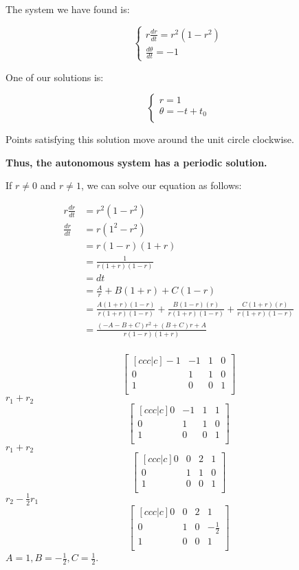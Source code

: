 \documentclass[letterpaper,12pt]{article}
\begin{document}
The system we have found is:

\[\begin{cases}
    r \frac{dr}{dt} = r^2(1-r^2)\\
    \frac{d\theta}{dt} = -1
    \end{cases}
\]


One of our solutions is:


\[\begin{cases}
    r = 1\\
    \theta = -t + t_0\\
    \end{cases}
\]


Points satisfying this solution move around the unit circle clockwise.


\textbf{Thus, the autonomous system has a periodic solution.}


If $r \ne 0$ and $r \ne 1$, we can solve our equation as follows:

\begin{align*}
    r \frac{dr}{dt} &= r^2 (1-r^2)\\
    \frac{dr}{dt} &= r(1^2 - r^2)\\
                  &= r (1-r)(1+r)\\
                  &=\frac{1}{r(1+r)(1-r)}\\
                  &= dt\\
                  &= \frac{A}{r} + B(1+r) + C(1-r)\\
                  &= \frac{A(1+r)(1-r)}{r(1+r)(1-r)} + \frac{B(1-r)(r)}{r(1+r)(1-r)} + \frac{C(1+r)(r)}{r(1+r)(1-r)}\\
                &= \frac{(-A-B+C)r^2 + (B+C)r +A}{r(1-r)(1+r)}\\
\end{align*}
\makeatletter
\renewcommand*\env@matrix[1][*\c@MaxMatrixCols c]{%
\hskip -\arraycolsep
\let\@ifnextchar\new@ifnextchar
\array{#1}}
\makeatother


\[
\begin{bmatrix}[ccc|c]
    -1 & -1 & 1 & 0\\
    0 & 1 & 1 & 0\\
    1 & 0 & 0 & 1\\
\end{bmatrix}
\]
$r_1 + r_2$
\[
\begin{bmatrix}[ccc|c]
    0 & -1 & 1 & 1\\
    0 & 1 & 1 & 0\\
    1 & 0 & 0 & 1\\
\end{bmatrix}
\]
$r_1 + r_2$
\[
\begin{bmatrix}[ccc|c]
    0 & 0 & 2 & 1\\
    0 & 1 & 1 & 0\\
    1 & 0 & 0 & 1\\
\end{bmatrix}
\]
$r_2 - \frac{1}{2}r_1$
\[
\begin{bmatrix}[ccc|c]
    0 & 0 & 2 & 1\\
    0 & 1 & 0 & -\frac{1}{2}\\
    1 & 0 & 0 & 1\\
\end{bmatrix}
\]
$A = 1, B = -\frac{1}{2}, C = \frac{1}{2}$.
\end{document}
